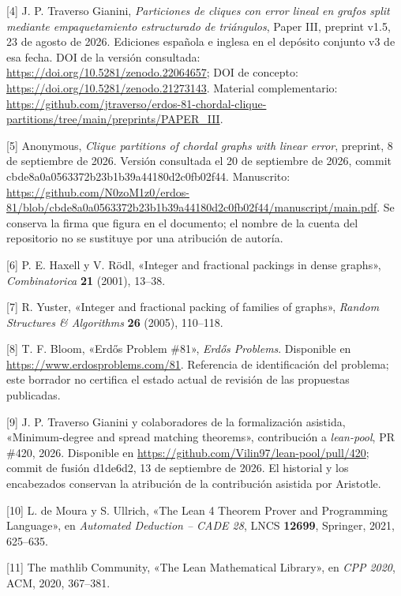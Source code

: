 \documentclass[spanish,11pt,a4paper]{article}
\begin{document}
{[}4{]} J. P. Traverso Gianini, \emph{Particiones de cliques con error lineal en grafos split mediante empaquetamiento estructurado de triángulos}, Paper III, preprint v1.5, 23 de agosto de 2026. Ediciones española e inglesa en el depósito conjunto v3 de esa fecha. DOI de la versión consultada: \url{https://doi.org/10.5281/zenodo.22064657}; DOI de concepto: \url{https://doi.org/10.5281/zenodo.21273143}. Material complementario: \url{https://github.com/jtraverso/erdos-81-chordal-clique-partitions/tree/main/preprints/PAPER_III}.

{[}5{]} Anonymous, \emph{Clique partitions of chordal graphs with linear error}, preprint, 8 de septiembre de 2026. Versión consultada el 20 de septiembre de 2026, commit {\ttfamily\small cbde8a0a0563\discretionary{\hbox{\ensuremath{\hookrightarrow}}}{}{}372b23b1b39a\discretionary{\hbox{\ensuremath{\hookrightarrow}}}{}{}44180d2c0fb0\discretionary{\hbox{\ensuremath{\hookrightarrow}}}{}{}2f44}. Manuscrito: \url{https://github.com/N0zoM1z0/erdos-81/blob/cbde8a0a0563372b23b1b39a44180d2c0fb02f44/manuscript/main.pdf}. Se conserva la firma que figura en el documento; el nombre de la cuenta del repositorio no se sustituye por una atribución de autoría.

{[}6{]} P. E. Haxell y V. Rödl, «Integer and fractional packings in dense graphs», \emph{Combinatorica} \textbf{21} (2001), 13--38.

{[}7{]} R. Yuster, «Integer and fractional packing of families of graphs», \emph{Random Structures \& Algorithms} \textbf{26} (2005), 110--118.

{[}8{]} T. F. Bloom, «Erdős Problem \#81», \emph{Erdős Problems}. Disponible en \url{https://www.erdosproblems.com/81}. Referencia de identificación del problema; este borrador no certifica el estado actual de revisión de las propuestas publicadas.

{[}9{]} J. P. Traverso Gianini y colaboradores de la formalización asistida, «Minimum-degree and spread matching theorems», contribución a \emph{lean-pool}, PR \#420, 2026. Disponible en \url{https://github.com/Vilin97/lean-pool/pull/420}; commit de fusión {\ttfamily\small d1de6d2}, 13 de septiembre de 2026. El historial y los encabezados conservan la atribución de la contribución asistida por Aristotle.

\clearpage
{[}10{]} L. de Moura y S. Ullrich, «The Lean 4 Theorem Prover and Programming Language», en \emph{Automated Deduction -- CADE 28}, LNCS \textbf{12699}, Springer, 2021, 625--635.

{[}11{]} The mathlib Community, «The Lean Mathematical Library», en \emph{CPP 2020}, ACM, 2020, 367--381.
\end{document}
